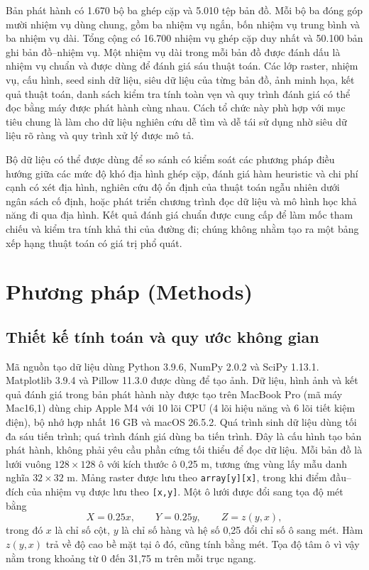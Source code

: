 \documentclass[11pt]{article}
\begin{document}
Bản phát hành có 1.670 bộ ba ghép cặp và 5.010 tệp bản đồ. Mỗi bộ ba đóng góp
mười nhiệm vụ dùng chung, gồm ba nhiệm vụ ngắn, bốn nhiệm vụ trung bình và ba
nhiệm vụ dài. Tổng cộng có 16.700 nhiệm vụ ghép cặp duy nhất và 50.100 bản ghi
bản đồ--nhiệm vụ. Một nhiệm vụ dài trong mỗi bản đồ được đánh dấu là nhiệm vụ
chuẩn và được dùng để đánh giá sáu thuật toán. Các lớp raster, nhiệm vụ, cấu hình,
seed sinh dữ liệu, siêu dữ liệu của từng bản đồ, ảnh minh họa, kết quả thuật toán,
danh sách kiểm tra tính toàn vẹn và quy trình đánh giá có thể đọc bằng máy được phát hành
cùng nhau. Cách tổ chức này phù hợp với mục tiêu chung là làm cho dữ liệu nghiên
cứu dễ tìm và dễ tái sử dụng nhờ siêu dữ liệu rõ ràng và quy trình xử lý được mô
tả\cite{fair}.

Bộ dữ liệu có thể được dùng để so sánh có kiểm soát các phương pháp điều hướng
giữa các mức độ khó địa hình ghép cặp, đánh giá hàm heuristic và chi phí cạnh có
xét địa hình, nghiên cứu độ ổn định của thuật toán ngẫu nhiên dưới ngân sách cố định, hoặc
phát triển chương trình đọc dữ liệu và mô hình học khả năng đi qua địa hình.
Kết quả đánh giá chuẩn được cung cấp để làm mốc tham chiếu và kiểm tra tính khả
thi của đường đi; chúng không nhằm tạo ra một bảng xếp hạng thuật toán có giá trị
phổ quát.

\section{Phương pháp (Methods)}

\subsection{Thiết kế tính toán và quy ước không gian}

Mã nguồn tạo dữ liệu dùng Python 3.9.6, NumPy 2.0.2 và SciPy
1.13.1\cite{numpy,scipy}. Matplotlib 3.9.4 và Pillow 11.3.0 được dùng để tạo
ảnh. Dữ liệu, hình ảnh và kết quả đánh giá trong bản phát hành này được tạo trên
MacBook Pro (mã máy Mac16,1) dùng chip Apple M4 với 10 lõi CPU
(4 lõi hiệu năng và 6 lõi tiết kiệm điện), bộ nhớ hợp nhất 16 GB và macOS
26.5.2. Quá trình sinh dữ liệu dùng tối đa sáu tiến trình; quá trình đánh giá
dùng ba tiến trình. Đây là cấu hình tạo bản phát hành, không phải yêu cầu phần
cứng tối thiểu để đọc dữ liệu. Mỗi bản đồ là lưới vuông $128\times128$ ô với kích
thước ô 0,25 m, tương ứng vùng lấy mẫu danh nghĩa $32\times32$ m. Mảng
raster được lưu theo \texttt{array[y][x]}, trong khi điểm đầu--đích của nhiệm vụ
được lưu theo \texttt{[x,y]}. Một ô lưới được đổi sang tọa độ mét bằng
\begin{equation}
  X=0.25x, \qquad Y=0.25y, \qquad Z=z(y,x),
\end{equation}
trong đó $x$ là chỉ số cột, $y$ là chỉ số hàng và hệ số 0,25 đổi chỉ số ô sang
mét. Hàm $z(y,x)$ trả về độ cao bề mặt tại ô đó, cũng tính bằng mét. Tọa độ tâm ô vì vậy nằm
trong khoảng từ 0 đến 31,75 m trên mỗi trục ngang.
\end{document}
